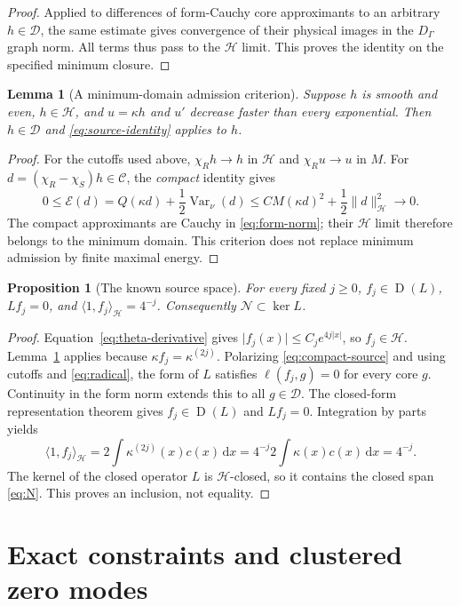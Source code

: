 \documentclass[11pt,a4paper]{article}
\newcommand{\HH}{\mathcal H}
\newcommand{\DD}{\mathcal D}
\newcommand{\EE}{\mathcal E}
\newcommand{\CC}{\mathcal C}
\newcommand{\NN}{\mathcal N}
\newcommand{\ip}[2]{\langle #1,#2\rangle}
\newcommand{\norm}[1]{\lVert #1\rVert}
\newcommand{\abs}[1]{\lvert #1\rvert}
\newcommand{\dd}{\,\mathrm d}
\newcommand{\Var}{\operatorname{Var}}
\newcommand{\Dom}{\operatorname{D}}
\newtheorem{proposition}[theorem]{Proposition}
\newtheorem{lemma}[theorem]{Lemma}
\theoremstyle{definition}
\theoremstyle{remark}
\numberwithin{equation}{section}
\begin{document}
\begin{proof}
Applied to differences of form-Cauchy core approximants to an arbitrary
$h\in\DD$, the same estimate gives convergence of their physical images
in the $D_\Gamma$ graph norm.
All terms thus pass to the $\HH$ limit. This proves the identity on the
specified minimum closure.
\end{proof}

\begin{lemma}[A minimum-domain admission criterion]\label{lem:admission}
Suppose $h$ is smooth and even, $h\in\HH$, and $u=\kappa h$ and $u'$
decrease faster than every exponential. Then $h\in\DD$ and
\eqref{eq:source-identity} applies to $h$.
\end{lemma}
\begin{proof}
For the cutoffs used above, $\chi_Rh\to h$ in $\HH$ and
$\chi_Ru\to u$ in $M$. For $d=(\chi_R-\chi_S)h\in\CC$, the
\emph{compact} identity gives
\begin{equation}\label{eq:cutoff-difference}
 0\le\EE(d)=Q(\kappa d)+\frac12\Var_\nu(d)
       \le C M(\kappa d)^2+\frac12\norm d_{\HH}^2\longrightarrow0.
\end{equation}
The compact approximants are Cauchy in \eqref{eq:form-norm}; their
$\HH$ limit therefore belongs to the minimum domain. This criterion does
not replace minimum admission by finite maximal energy.
\end{proof}

\begin{proposition}[The known source space]\label{prop:source-space}
For every fixed $j\ge0$, $f_j\in\Dom(L)$, $Lf_j=0$, and
$\ip1{f_j}_{\HH}=4^{-j}$. Consequently $\NN\subset\ker L$.
\end{proposition}
\begin{proof}
Equation~\eqref{eq:theta-derivative} gives
$\abs{f_j(x)}\le C_j e^{4j\abs{x}}$, so $f_j\in\HH$.
Lemma~\ref{lem:admission} applies because $\kappa f_j=\kappa^{(2j)}$.
Polarizing \eqref{eq:compact-source} and using cutoffs and
\eqref{eq:radical}, the form of $L$ satisfies
$\ell(f_j,g)=0$ for every core $g$. Continuity in the form norm extends
this to all $g\in\DD$. The closed-form representation theorem gives
$f_j\in\Dom(L)$ and $Lf_j=0$. Integration by parts yields
\[
 \ip1{f_j}_{\HH}=2\int\kappa^{(2j)}(x)c(x)\dd x
       =4^{-j}2\int\kappa(x)c(x)\dd x=4^{-j}.
\]
The kernel of the closed operator $L$ is $\HH$-closed, so it contains the
closed span \eqref{eq:N}. This proves an inclusion, not equality.
\end{proof}

\section{Exact constraints and clustered zero modes}\label{sec:modes}
\end{document}
